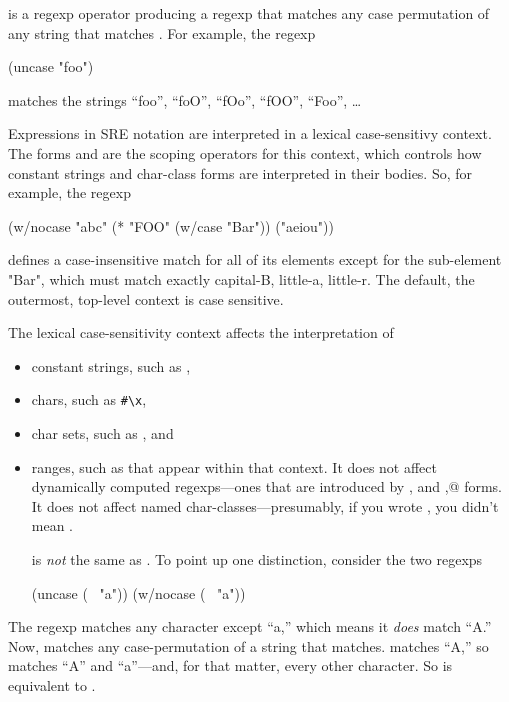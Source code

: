  is a regexp operator producing a regexp that matches any
case permutation of any string that matches .
For example, the regexp
\begin{code}
(uncase "foo")\end{code}%
%
matches the strings ``foo'', ``foO'', ``fOo'', ``fOO'', ``Foo'', \ldots

Expressions in SRE notation are interpreted in a lexical case-sensitivy
context. The forms  and  are the scoping operators 
for this context, which controls how constant strings and char-class forms are
interpreted in their bodies. So, for example, the regexp
\begin{code}
(w/nocase "abc"
          (* "FOO" (w/case "Bar"))
          ("aeiou"))\end{code}%
%
defines a case-insensitive match for all of its elements except for the
sub-element "Bar", which must match exactly capital-B, little-a, little-r.
The default, the outermost, top-level context is case sensitive.

The lexical case-sensitivity context affects the interpretation of
\begin{itemize}
    \item constant strings, such as ,
    \item chars, such as \verb|#\x|,
    \item char sets, such as , and
    \item ranges, such as 
that appear within that context. It does not affect dynamically computed
regexps---ones that are introduced by , and ,@ forms. 
It does not affect named char-classes---presumably, 
if you wrote , you didn't mean .

 is \emph{not} the same as . 
To point up one distinction, consider the two regexps
\begin{code}
(uncase   (~ "a"))
(w/nocase (~ "a"))\end{code}%
%
\end{itemize}

The regexp  matches any character except ``a,'' 
which means it \emph{does} match ``A.'' 
Now,  matches any case-permutation of a string that
 matches. 
 matches ``A,'' 
so  matches ``A'' and ``a''---and,
for that matter, every other character. 
So  is equivalent to .

